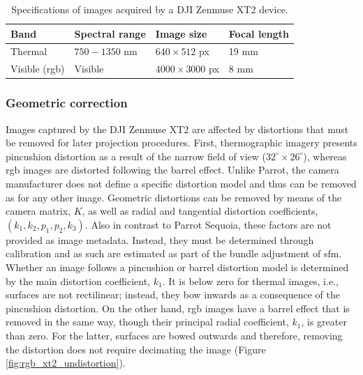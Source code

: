 \renewcommand{\arraystretch}{1.2}
\begin{table}[ht]
    \caption{Specifications of images acquired by a DJI Zenmuse XT2 device.}
    \label{table:zenmuse_xt2}
    \begin{tabular}{llll}
        \toprule
        Band & Spectral range & Image size & Focal length\\
        \midrule
        Thermal & $750-1350$ \si{\nano\meter} & $640 \times 512$ px & 19 \si{\milli\meter}\\
        Visible (\acrshort{rgb}) & Visible & $4000 \times 3000$ px & 8 \si{\milli\meter}\\
        \bottomrule
    \end{tabular}
\end{table}
\renewcommand{\arraystretch}{1}

\subsubsection{Geometric correction}

Images captured by the DJI Zenmuse XT2 are affected by distortions that must be removed for later projection procedures. First, thermographic imagery presents pincushion distortion as a result of the narrow field of view ($32^\circ \times 26^\circ$), whereas \acrshort{rgb} images are distorted following the barrel effect. Unlike Parrot, the camera manufacturer does not define a specific distortion model and thus can be removed as for any other image. Geometric distortions can be removed by means of the camera matrix, $K$, as well as radial and tangential distortion coefficients, $(k_1, k_2, p_1, p_2, k_3)$. Also in contrast to Parrot Sequoia, these factors are not provided as image metadata. Instead, they must be determined through calibration and as such are estimated as part of the bundle adjustment of \acrshort{sfm}. Whether an image follows a pincushion or barrel distortion model is determined by the main distortion coefficient, $k_1$. It is below zero for thermal images, i.e., surfaces are not rectilinear; instead, they bow inwards as a consequence of the pincushion distortion. On the other hand, \acrshort{rgb} images have a barrel effect that is removed in the same way, though their principal radial coefficient, $k_1$, is greater than zero. For the latter, surfaces are bowed outwards and therefore, removing the distortion does not require decimating the image (Figure \ref{fig:rgb_xt2_undistortion}).

